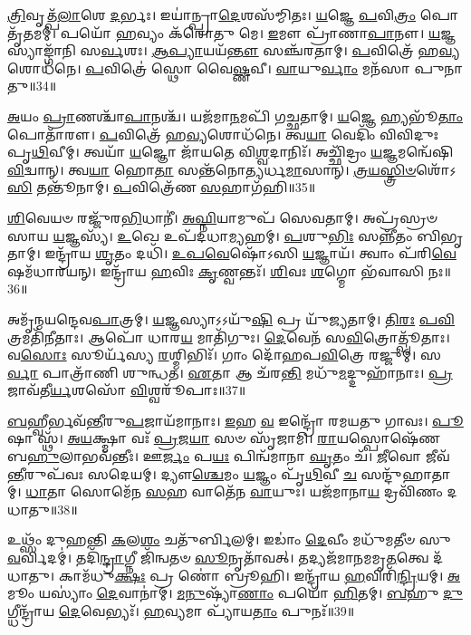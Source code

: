 \-\ul{𑌤𑍍𑌰𑌿}\-𑌵𑍃𑌤𑍍𑌪᳴\-\ul{𑌲𑌾}\-𑌶𑍇 \ul{𑌦}\-𑌰𑍍𑌭𑌃।
𑌇𑌯𑌾॑𑌨𑍍𑌪𑍍𑌰𑌾\-\ul{𑌦𑍇}\-𑌶𑌸᳴𑌮𑍍𑌮𑌿𑌤𑌃।
\-\ul{𑌯}\-𑌜𑍍𑌞𑍇 \ul{𑌪}\-𑌵𑌿\-\ul{𑌤𑍍𑌰𑌂} 𑌪𑍋𑌤𑍃᳴𑌤𑌮𑌮𑍍।
𑌪𑌯𑍋᳴ \ul{𑌹}\-𑌵𑍍𑌯𑌂 𑌕᳴𑌰𑍋𑌤𑍁 𑌮𑍇।
\-\ul{𑌇}\-𑌮𑍗 𑌪𑍍𑌰𑌾᳴𑌣𑌾\-\ul{𑌪𑌾}\-𑌨𑍗।
\-\ul{𑌯}\-𑌜𑍍𑌞𑌸𑍍𑌯𑌾𑌙𑍍𑌗𑌾᳴𑌨𑌿 𑌸\-\ul{𑌰𑍍𑌵}\-𑌶𑌃।
\-\ul{𑌆}\-\-\ul{𑌪𑍍𑌯𑌾}\-𑌯𑌯᳴\-\ul{𑌨𑍍𑌤𑍗} 𑌸𑌞𑍍𑌚᳴𑌰𑌤𑌾𑌮𑍍।
\-\ul{𑌪}\-𑌵𑌿𑌤𑍍𑌰𑍇᳴ 𑌹\-\ul{𑌵𑍍𑌯}\-𑌶𑍋𑌧᳴𑌨𑍇।
\-\ul{𑌪}\-𑌵𑌿𑌤𑍍𑌰𑍇॑ 𑌸𑍍𑌥𑍋 𑌵𑍈\-\ul{𑌷𑍍𑌣}\-𑌵𑍀।
\-\ul{𑌵𑌾}\-𑌯𑍁\-\ul{𑌰𑍍𑌵𑌾𑌂} 𑌮𑌨᳴𑌸𑌾 𑌪𑍁𑌨𑌾𑌤𑍁॥34॥

\-\ul{𑌅}\-𑌯𑌂 \ul{𑌪𑍍𑌰𑌾}\-𑌣𑌶𑍍𑌚𑌾᳴\-\ul{𑌪𑌾}\-𑌨𑌶𑍍𑌚᳴।
𑌯𑌜᳴𑌮𑌾\-\ul{𑌨}\-𑌮𑌪𑌿᳴ 𑌗𑌚𑍍𑌛𑌤𑌾𑌮𑍍।
\-\ul{𑌯}\-𑌜𑍍𑌞𑍇 𑌹𑍍𑌯𑌭𑍂᳴\-\ul{𑌤𑌾𑌂} 𑌪𑍋𑌤𑌾᳴𑌰𑍗।
\-\ul{𑌪}\-𑌵𑌿𑌤𑍍𑌰𑍇᳴ 𑌹\-\ul{𑌵𑍍𑌯}\-𑌶𑍋𑌧᳴𑌨𑍇।
𑌤𑍍𑌵\-\ul{𑌯𑌾} 𑌵𑍇𑌦𑌿𑌂᳴ 𑌵𑌿𑌵𑌿𑌦𑍁𑌃 𑌪𑍃\-\ul{𑌥𑌿}\-𑌵𑍀𑌮𑍍।
𑌤𑍍𑌵𑌯𑌾᳴ \ul{𑌯}\-𑌜𑍍𑌞𑍋 𑌜𑌾᳴𑌯𑌤𑍇 𑌵𑌿\-\ul{𑌶𑍍𑌵}\-𑌦𑌾𑌨𑌿𑌃᳴।
𑌅𑌚𑍍𑌛𑌿᳴𑌦𑍍𑌰𑌂 \ul{𑌯}\-𑌜𑍍𑌞𑌮𑌨𑍍𑌵𑍇᳴𑌷𑌿 \ul{𑌵𑌿}\-𑌦𑍍𑌵𑌾𑌨𑍍।
𑌤𑍍𑌵\-\ul{𑌯𑌾} 𑌹𑍋\-\ul{𑌤𑌾} 𑌸𑌨𑍍𑌤᳴𑌨𑍋𑌤𑍍𑌯𑌰𑍍𑌧\-\ul{𑌮𑌾}\-𑌸𑌾𑌨𑍍।
\-\ul{𑌤𑍍𑌰}\-\-\ul{𑌯}\-\-\ul{𑌸𑍍𑌤𑍍𑌰𑌿}\-\-\ul{𑍞}\-𑌶𑍋᳴𑌽\-\ul{𑌸𑌿} 𑌤𑌨𑍍𑌤𑍂᳴𑌨𑌾𑌮𑍍।
\-\ul{𑌪}\-𑌵𑌿𑌤𑍍𑌰𑍇᳴𑌣 \ul{𑌸}\-𑌹𑌾𑌗᳴𑌹𑌿॥35॥

\-\ul{𑌶𑌿}\-𑌵𑍇𑌯𑍞 𑌰𑌜𑍍𑌜𑍁᳴𑌰\-\ul{𑌭𑌿}\-𑌧𑌾𑌨𑍀॑।
\-\ul{𑌅}\-\-\ul{𑌘𑍍𑌨𑌿}\-𑌯𑌾𑌮𑍁𑌪᳴ 𑌸𑍇𑌵𑌤𑌾𑌮𑍍।
𑌅𑌪𑍍𑌰᳴𑌸𑍍𑌰𑍞𑌸𑌾𑌯 \ul{𑌯}\-𑌜𑍍𑌞𑌸𑍍𑌯᳴।
\-\ul{𑌉}\-𑌖𑍇 𑌉𑌪᳴𑌦𑌧𑌾\-\ul{𑌮𑍍𑌯}\-𑌹𑌮𑍍।
\-\ul{𑌪}\-𑌶𑍁\-\ul{𑌭𑌿𑌃} 𑌸𑌨𑍍𑌨𑍀᳴𑌤𑌂 𑌬𑌿𑌭𑍃𑌤𑌾𑌮𑍍।
𑌇𑌨𑍍𑌦𑍍𑌰𑌾᳴𑌯 \ul{𑌶𑍃}\-𑌤𑌂 𑌦𑌧𑌿᳴।
\-\ul{𑌉}\-\-\ul{𑌪}\-\-\ul{𑌵𑍇}\-𑌷𑍋᳴𑌽𑌸𑌿 \ul{𑌯}\-𑌜𑍍𑌞𑌾𑌯᳴।
𑌤𑍍𑌵𑌾𑌂 𑌪᳴𑌰𑌿\-\ul{𑌵𑍇}\-𑌷𑌮᳴𑌧𑌾𑌰𑌯𑌨𑍍।
𑌇𑌨𑍍𑌦𑍍𑌰𑌾᳴𑌯 \ul{𑌹}\-𑌵𑌿𑌃 \ul{𑌕𑍃}\-𑌣𑍍𑌵𑌨𑍍𑌤𑌃᳴।
\-\ul{𑌶𑌿}\-𑌵𑌃 \ul{𑌶}\-𑌗𑍍𑌮𑍋 𑌭᳴𑌵𑌾𑌸𑌿 𑌨𑌃॥36॥

𑌅𑌮𑍃᳴𑌨𑍍𑌮𑌯𑌨𑍍𑌦𑍇𑌵\-\ul{𑌪𑌾}\-𑌤𑍍𑌰𑌮𑍍।
\-\ul{𑌯}\-𑌜𑍍𑌞𑌸𑍍𑌯𑌾𑌽𑌽𑌯𑍁᳴\-\ul{𑌷𑌿} 𑌪𑍍𑌰 𑌯𑍁᳴𑌜𑍍𑌯𑌤𑌾𑌮𑍍।
\-\ul{𑌤𑌿}\-\-\ul{𑌰𑌃} \ul{𑌪}\-\-\ul{𑌵𑌿}\-𑌤𑍍𑌰𑌮𑌤𑌿᳴𑌨𑍀𑌤𑌾𑌃।
𑌆𑌪𑍋᳴ 𑌧𑌾𑌰\-\ul{𑌯} 𑌮𑌾𑌤𑌿᳴𑌗𑍁𑌃।
\-\ul{𑌦𑍇}\-𑌵𑍇𑌨᳴ 𑌸\-\ul{𑌵𑌿}\-𑌤𑍍𑌰𑍋𑌤𑍍𑌪𑍂᳴𑌤𑌾𑌃।
𑌵\-\ul{𑌸𑍋𑌃} 𑌸𑍂𑌰𑍍𑌯᳴𑌸𑍍𑌯 \ul{𑌰}\-𑌶𑍍𑌮𑌿𑌭𑌿𑌃᳴।
𑌗𑌾𑌂 𑌦𑍋᳴𑌹𑌪\-\ul{𑌵𑌿}\-𑌤𑍍𑌰𑍇 𑌰𑌜𑍍𑌜𑍁𑌮𑍍॑।
𑌸\-\ul{𑌰𑍍𑌵𑌾} 𑌪𑌾𑌤𑍍𑌰𑌾᳴𑌣𑌿 𑌶𑍁𑌨𑍍𑌧𑌤।
\-\ul{𑌏}\-𑌤𑌾 𑌆 𑌚᳴𑌰\-\ul{𑌨𑍍𑌤𑌿} 𑌮𑌧𑍁᳴\-\ul{𑌮}\-𑌦𑍍𑌦𑍁𑌹𑌾᳴𑌨𑌾𑌃।
\-\ul{𑌪𑍍𑌰}\-𑌜𑌾𑌵᳴𑌤𑍀\-\ul{𑌰𑍍𑌯}\-𑌶𑌸𑍋᳴ \ul{𑌵𑌿}\-𑌶𑍍𑌵𑌰𑍂᳴𑌪𑌾𑌃॥37॥

\-\ul{𑌬}\-𑌹𑍍𑌵𑍀𑌰𑍍𑌭𑌵᳴\-\ul{𑌨𑍍𑌤𑍀}\-𑌰𑍁\-\ul{𑌪}\-𑌜𑌾𑌯᳴𑌮𑌾𑌨𑌾𑌃।
\-\ul{𑌇}\-𑌹 \ul{𑌵} 𑌇𑌨𑍍𑌦𑍍𑌰𑍋᳴ 𑌰𑌮𑌯𑌤𑍁 𑌗𑌾𑌵𑌃।
\-\ul{𑌪𑍂}\-𑌷𑌾 𑌸𑍍𑌥᳴।
\-\ul{𑌅}\-\-\ul{𑌯}\-𑌕𑍍𑌷𑍍𑌮𑌾 𑌵𑌃᳴ \ul{𑌪𑍍𑌰}\-𑌜\-\ul{𑌯𑌾} 𑌸𑍞 𑌸𑍃᳴𑌜𑌾𑌮𑌿।
\-\ul{𑌰𑌾}\-𑌯𑌸𑍍𑌪𑍋𑌷𑍇᳴𑌣 𑌬\-\ul{𑌹𑍁}\-𑌲𑌾𑌭𑌵᳴𑌨𑍍𑌤𑍀𑌃।
𑌊\-\ul{𑌰𑍍𑌜𑌂} 𑌪\-\ul{𑌯𑌃} 𑌪𑌿𑌨𑍍𑌵᳴𑌮𑌾𑌨𑌾 \ul{𑌘𑍃}\-𑌤𑌂 𑌚᳴।
\-\ul{𑌜𑍀}\-𑌵𑍋 𑌜𑍀𑌵᳴\-\ul{𑌨𑍍𑌤𑍀}\-𑌰𑍁𑌪᳴𑌵𑌃 𑌸𑌦𑍇𑌯𑌮𑍍।
𑌦𑍍𑌯𑍗\-\ul{𑌶𑍍𑌚𑍇}\-𑌮𑌂 \ul{𑌯}\-𑌜𑍍𑌞𑌂 𑌪𑍃᳴\-\ul{𑌥𑌿}\-𑌵𑍀 \ul{𑌚} 𑌸𑌨𑍍𑌦𑍁᳴𑌹𑌾𑌤𑌾𑌮𑍍।
\-\ul{𑌧𑌾}\-𑌤𑌾 𑌸𑍋𑌮𑍇᳴𑌨 \ul{𑌸}\-𑌹 𑌵𑌾𑌤𑍇᳴𑌨 \ul{𑌵𑌾}\-𑌯𑍁𑌃।
𑌯𑌜᳴𑌮𑌾𑌨𑌾\-\ul{𑌯} 𑌦𑍍𑌰𑌵𑌿᳴𑌣𑌂 𑌦𑌧𑌾𑌤𑍁॥38॥

𑌉𑌥𑍍𑌸𑌂᳴ 𑌦𑍁𑌹𑌨𑍍𑌤𑌿 \ul{𑌕}\-𑌲\-\ul{𑌶𑌂} 𑌚𑌤𑍁᳴𑌰𑍍𑌬𑌿𑌲𑌮𑍍।
𑌇𑌡𑌾𑌂॑ \ul{𑌦𑍇}\-𑌵𑍀𑌂 𑌮𑌧𑍁᳴𑌮𑌤𑍀𑍞 𑌸𑍁\-\ul{𑌵}\-𑌰𑍍𑌵𑌿𑌦𑌮𑍍॑।
𑌤𑌦𑌿᳴\-\ul{𑌨𑍍𑌦𑍍𑌰𑌾}\-𑌗𑍍𑌨𑍀 𑌜𑌿᳴𑌨𑍍𑌵𑌤𑍞 \ul{𑌸𑍂}\-𑌨𑍃𑌤𑌾᳴𑌵𑌤𑍍।
𑌤𑌦𑍍𑌯𑌜᳴𑌮𑌾𑌨\-𑌮𑌮𑍃\-\ul{𑌤}\-𑌤𑍍𑌵𑍇 𑌦᳴𑌧𑌾𑌤𑍁।
𑌕𑌾𑌮᳴𑌧𑍁\-\ul{𑌕𑍍𑌷𑌃} 𑌪𑍍𑌰 𑌣𑍋॑ 𑌬𑍍𑌰𑍂𑌹𑌿।
𑌇𑌨𑍍𑌦𑍍𑌰𑌾᳴𑌯 \ul{𑌹}\-𑌵𑌿𑌰𑌿᳴\-\ul{𑌨𑍍𑌦𑍍𑌰𑌿}\-𑌯𑌮𑍍।
\-\ul{𑌅}\-𑌮𑍂𑌂 𑌯𑌸𑍍𑌯𑌾𑌂॑ \ul{𑌦𑍇}\-𑌵𑌾𑌨𑌾॑𑌮𑍍।
\-\ul{𑌮}\-\-\ul{𑌨𑍁}\-𑌷𑍍𑌯𑌾᳴\-\ul{𑌣𑌾𑌂} 𑌪𑌯𑍋᳴ \ul{𑌹𑌿}\-𑌤𑌮𑍍।
\-\ul{𑌬}\-𑌹𑍁 \ul{𑌦𑍁}\-𑌗𑍍𑌧𑍀𑌨𑍍𑌦𑍍𑌰𑌾᳴𑌯 \ul{𑌦𑍇}\-𑌵𑍇𑌭𑍍𑌯𑌃᳴।
\-\ul{𑌹}\-𑌵𑍍𑌯𑌮𑌾 𑌪𑍍𑌯𑌾᳴𑌯\-\ul{𑌤𑌾𑌂} 𑌪𑍁𑌨𑌃᳴॥39॥

